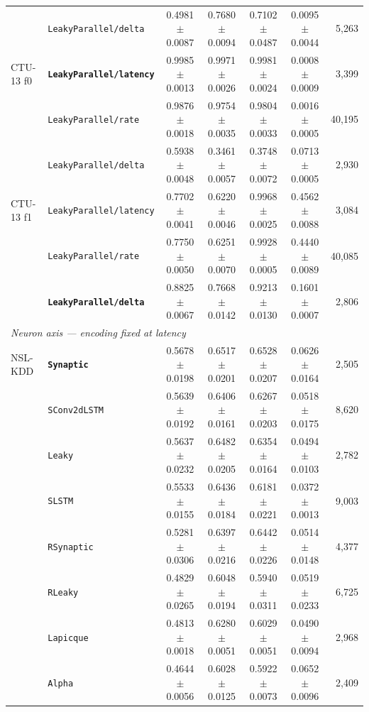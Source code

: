\begin{table}[t]
{\begin{tabular}{l l c c c c r}
 & \texttt{LeakyParallel/delta} & 0.4981 $\pm$ 0.0087 & 0.7680 $\pm$ 0.0094 & 0.7102 $\pm$ 0.0487 & 0.0095 $\pm$ 0.0044 & 5{,}263 \\
CTU-13 f0 & \textbf{\texttt{LeakyParallel/latency}} & 0.9985 $\pm$ 0.0013 & 0.9971 $\pm$ 0.0026 & 0.9981 $\pm$ 0.0024 & 0.0008 $\pm$ 0.0009 & 3{,}399 \\
 & \texttt{LeakyParallel/rate} & 0.9876 $\pm$ 0.0018 & 0.9754 $\pm$ 0.0035 & 0.9804 $\pm$ 0.0033 & 0.0016 $\pm$ 0.0005 & 40{,}195 \\
 & \texttt{LeakyParallel/delta} & 0.5938 $\pm$ 0.0048 & 0.3461 $\pm$ 0.0057 & 0.3748 $\pm$ 0.0072 & 0.0713 $\pm$ 0.0005 & 2{,}930 \\
CTU-13 f1 & \texttt{LeakyParallel/latency} & 0.7702 $\pm$ 0.0041 & 0.6220 $\pm$ 0.0046 & 0.9968 $\pm$ 0.0025 & 0.4562 $\pm$ 0.0088 & 3{,}084 \\
 & \texttt{LeakyParallel/rate} & 0.7750 $\pm$ 0.0050 & 0.6251 $\pm$ 0.0070 & 0.9928 $\pm$ 0.0005 & 0.4440 $\pm$ 0.0089 & 40{,}085 \\
 & \textbf{\texttt{LeakyParallel/delta}} & 0.8825 $\pm$ 0.0067 & 0.7668 $\pm$ 0.0142 & 0.9213 $\pm$ 0.0130 & 0.1601 $\pm$ 0.0007 & 2{,}806 \\
\midrule
\multicolumn{7}{l}{\textit{Neuron axis --- encoding fixed at latency}} \\
\midrule
NSL-KDD & \textbf{\texttt{Synaptic}} & 0.5678 $\pm$ 0.0198 & 0.6517 $\pm$ 0.0201 & 0.6528 $\pm$ 0.0207 & 0.0626 $\pm$ 0.0164 & 2{,}505 \\
 & \texttt{SConv2dLSTM} & 0.5639 $\pm$ 0.0192 & 0.6406 $\pm$ 0.0161 & 0.6267 $\pm$ 0.0203 & 0.0518 $\pm$ 0.0175 & 8{,}620 \\
 & \texttt{Leaky} & 0.5637 $\pm$ 0.0232 & 0.6482 $\pm$ 0.0205 & 0.6354 $\pm$ 0.0164 & 0.0494 $\pm$ 0.0103 & 2{,}782 \\
 & \texttt{SLSTM} & 0.5533 $\pm$ 0.0155 & 0.6436 $\pm$ 0.0184 & 0.6181 $\pm$ 0.0221 & 0.0372 $\pm$ 0.0013 & 9{,}003 \\
 & \texttt{RSynaptic} & 0.5281 $\pm$ 0.0306 & 0.6397 $\pm$ 0.0216 & 0.6442 $\pm$ 0.0226 & 0.0514 $\pm$ 0.0148 & 4{,}377 \\
 & \texttt{RLeaky} & 0.4829 $\pm$ 0.0265 & 0.6048 $\pm$ 0.0194 & 0.5940 $\pm$ 0.0311 & 0.0519 $\pm$ 0.0233 & 6{,}725 \\
 & \texttt{Lapicque} & 0.4813 $\pm$ 0.0018 & 0.6280 $\pm$ 0.0051 & 0.6029 $\pm$ 0.0051 & 0.0490 $\pm$ 0.0094 & 2{,}968 \\
 & \texttt{Alpha} & 0.4644 $\pm$ 0.0056 & 0.6028 $\pm$ 0.0125 & 0.5922 $\pm$ 0.0073 & 0.0652 $\pm$ 0.0096 & 2{,}409 \\

\end{tabular}}
\end{table}
